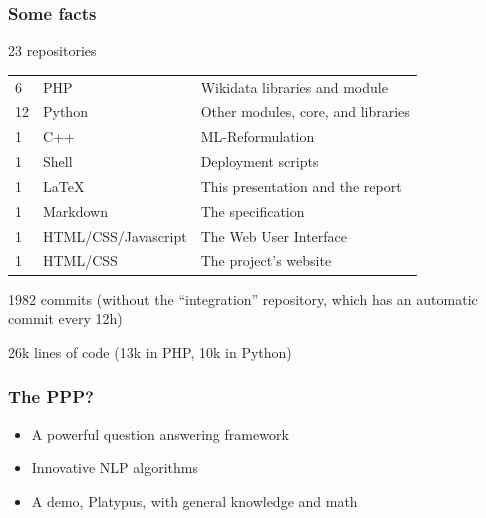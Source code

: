 \begin{frame}
    \frametitle{Some facts} %
    \alert{23 repositories}

    \begin{tabular}{lll}
        6 & PHP & Wikidata libraries and module\\
        12 & Python & Other modules, core, and libraries\\
        1 & C++ & ML-Reformulation\\
        1 & Shell & Deployment scripts\\
        1 & \LaTeX & This presentation and the report\\
        1 & Markdown & The specification\\
        1 & HTML/CSS/Javascript & The Web User Interface\\
        1 & HTML/CSS & The project's website\\
    \end{tabular}

    \alert{1982 commits} (without the ``integration'' repository, which has an automatic commit every 12h)

    \alert{26k lines} of code (13k in PHP, 10k in Python)
\end{frame}

\begin{frame}
    \frametitle{The PPP?}

    \begin{itemize}
        \item A powerful question answering framework
        \item Innovative NLP algorithms
        \item A demo, \alert{Platypus}, with general knowledge and math
    \end{itemize}
\end{frame}


